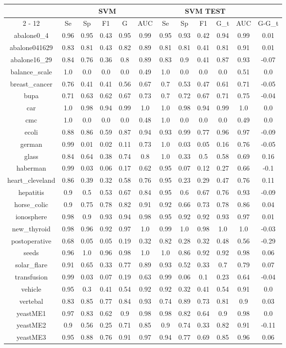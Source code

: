 \documentclass{article}%
\begin{document}
\begin{tabular}{|c|c|c|c|c|c|c|c|c|c|c|c|}%
\hline%
&\multicolumn{5}{|c|}{SVM}&\multicolumn{5}{|c|}{SVM TEST}&\\%
\cline{2%
-%
12}%
&Se&Sp&F1&G&AUC&Se&Sp&F1&G\_t&AUC&G{-}G\_t\\%
\hline%
abalone0\_4&0.96&0.95&0.43&0.95&0.99&0.95&0.93&0.42&0.94&0.99&0.01\\%
abalone041629&0.83&0.81&0.43&0.82&0.89&0.81&0.81&0.41&0.81&0.91&0.01\\%
abalone16\_29&0.84&0.76&0.36&0.8&0.89&0.83&0.9&0.41&0.87&0.93&{-}0.07\\%
balance\_scale&1.0&0.0&0.0&0.0&0.49&1.0&0.0&0.0&0.0&0.51&0.0\\%
breast\_cancer&0.76&0.41&0.41&0.56&0.67&0.7&0.53&0.47&0.61&0.71&{-}0.05\\%
bupa&0.71&0.63&0.62&0.67&0.73&0.7&0.72&0.67&0.71&0.75&{-}0.04\\%
car&1.0&0.98&0.94&0.99&1.0&1.0&0.98&0.94&0.99&1.0&0.0\\%
cmc&1.0&0.0&0.0&0.0&0.48&1.0&0.0&0.0&0.0&0.49&0.0\\%
ecoli&0.88&0.86&0.59&0.87&0.94&0.93&0.99&0.77&0.96&0.97&{-}0.09\\%
german&0.99&0.01&0.02&0.11&0.73&1.0&0.03&0.05&0.16&0.76&{-}0.05\\%
glass&0.84&0.64&0.38&0.74&0.8&1.0&0.33&0.5&0.58&0.69&0.16\\%
haberman&0.99&0.03&0.06&0.17&0.62&0.95&0.07&0.12&0.27&0.66&{-}0.1\\%
heart\_cleveland&0.86&0.39&0.32&0.58&0.76&0.95&0.23&0.29&0.47&0.76&0.11\\%
hepatitis&0.9&0.5&0.53&0.67&0.84&0.95&0.6&0.67&0.76&0.93&{-}0.09\\%
horse\_colic&0.9&0.75&0.78&0.82&0.91&0.92&0.66&0.73&0.78&0.86&0.04\\%
ionosphere&0.98&0.9&0.93&0.94&0.98&0.95&0.92&0.92&0.93&0.97&0.01\\%
new\_thyroid&0.98&0.96&0.92&0.97&1.0&0.99&1.0&0.98&1.0&1.0&{-}0.03\\%
postoperative&0.68&0.05&0.05&0.19&0.32&0.82&0.28&0.32&0.48&0.56&{-}0.29\\%
seeds&0.96&1.0&0.96&0.98&1.0&1.0&0.86&0.92&0.92&0.98&0.06\\%
solar\_flare&0.91&0.65&0.33&0.77&0.89&0.93&0.52&0.33&0.7&0.79&0.07\\%
transfusion&0.99&0.03&0.07&0.19&0.63&0.99&0.06&0.1&0.23&0.64&{-}0.04\\%
vehicle&0.95&0.3&0.41&0.54&0.92&0.92&0.32&0.41&0.54&0.91&0.0\\%
vertebal&0.83&0.85&0.77&0.84&0.93&0.74&0.89&0.73&0.81&0.9&0.03\\%
yeastME1&0.97&0.83&0.62&0.9&0.98&0.98&0.82&0.64&0.9&0.98&0.0\\%
yeastME2&0.9&0.56&0.25&0.71&0.85&0.9&0.74&0.33&0.82&0.91&{-}0.11\\%
yeastME3&0.95&0.88&0.76&0.91&0.97&0.94&0.77&0.69&0.85&0.96&0.06\\%
\hline%
\end{tabular}

%
\end{document}
